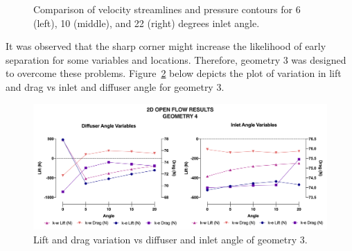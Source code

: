 \begin{figure}[!hb]
   \noindent{}
   \caption{Comparison of velocity streamlines and pressure contours for 6 (left), 10 (middle), and 22 (right) degrees inlet angle.}
   \label{fig:A1_Contour_inlet_compare}
\end{figure}

\noindent It was observed that the sharp corner might increase the likelihood of early separation for some variables and locations. Therefore, geometry 3 was designed to overcome these problems. Figure~\ref{fig:2D_OF_A4_results} below depicts the plot of variation in lift and drag vs inlet and diffuser angle for geometry 3.

\begin{figure}[!ht]
    \centering
    \includegraphics[scale=0.6]{Figures/Graph/2D_OF_A4.png}
    \caption{Lift and drag variation vs diffuser and inlet angle of geometry 3.}
    \label{fig:2D_OF_A4_results}
\end{figure}

